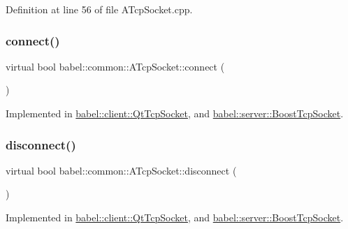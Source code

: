 Definition at line 56 of file A\+Tcp\+Socket.\+cpp.

\mbox{\label{classbabel_1_1common_1_1_a_tcp_socket_ae049c9a079ad9e4f0ddfc4b2282e2493}} 
\subsubsection{\texorpdfstring{connect()}{connect()}}
{\footnotesize\ttfamily virtual bool babel\+::common\+::\+A\+Tcp\+Socket\+::connect (\begin{DoxyParamCaption}{ }\end{DoxyParamCaption})\hspace{0.3cm}{\ttfamily [pure virtual]}}



Implemented in \mbox{\hyperlink{classbabel_1_1client_1_1_qt_tcp_socket_a61e2297c813f090a97dc49d0c2a8c2c3}{babel\+::client\+::\+Qt\+Tcp\+Socket}}, and \mbox{\hyperlink{classbabel_1_1server_1_1_boost_tcp_socket_aaf7b9b56a3587d8b48c5ed9418492e12}{babel\+::server\+::\+Boost\+Tcp\+Socket}}.

\mbox{\label{classbabel_1_1common_1_1_a_tcp_socket_a8aa4d31dccc7314d5866410846d83159}} 
\subsubsection{\texorpdfstring{disconnect()}{disconnect()}}
{\footnotesize\ttfamily virtual bool babel\+::common\+::\+A\+Tcp\+Socket\+::disconnect (\begin{DoxyParamCaption}{ }\end{DoxyParamCaption})\hspace{0.3cm}{\ttfamily [pure virtual]}}



Implemented in \mbox{\hyperlink{classbabel_1_1client_1_1_qt_tcp_socket_a16d6be985545aaa0376250896accc586}{babel\+::client\+::\+Qt\+Tcp\+Socket}}, and \mbox{\hyperlink{classbabel_1_1server_1_1_boost_tcp_socket_ab5f0e6ea149aa5c1b54189b2214bac88}{babel\+::server\+::\+Boost\+Tcp\+Socket}}.

